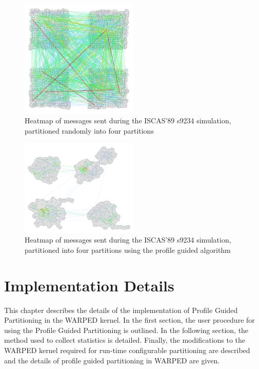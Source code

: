 \documentclass[11pt]{book}
\begin{document}
\begin{figure}[ht]\label{fig:s5378_4rr}
\centering
\includegraphics[clip=true,width=0.5\textwidth]{figs/s9234_4rr}
\caption{Heatmap of messages sent during the ISCAS'89 s9234 simulation, partitioned randomly into four partitions}
\end{figure}

\begin{figure}[ht]\label{fig:s5378_4part}
\centering
\includegraphics[clip=true,width=0.5\textwidth]{figs/s9234_4part}
\caption{Heatmap of messages sent during the ISCAS'89 s9234 simulation, partitioned into four partitions using the profile guided algorithm}
\end{figure}

\chapter{Implementation Details}\label{implementationDetails}

This chapter describes the details of the implementation of Profile Guided Partitioning in the WARPED kernel. In the first section, the user procedure for using the Profile Guided Partitioning is outlined. In the following section, the method used to collect statistics is detailed. Finally, the modifications to the WARPED kernel required for run-time configurable partitioning are described and the details of profile guided partitioning in WARPED are given.
\end{document}
